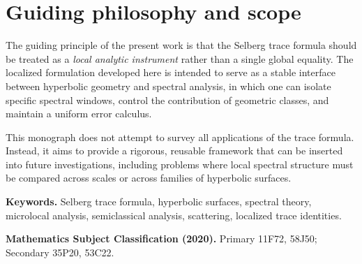 \section*{Guiding philosophy and scope}

The guiding principle of the present work is that the Selberg trace formula should be treated as a \emph{local analytic instrument} rather than a single global equality.
The localized formulation developed here is intended to serve as a stable interface between hyperbolic geometry and spectral analysis, in which one can isolate specific spectral windows, control the contribution of geometric classes, and maintain a uniform error calculus.

This monograph does not attempt to survey all applications of the trace formula.
Instead, it aims to provide a rigorous, reusable framework that can be inserted into future investigations, including problems where local spectral structure must be compared across scales or across families of hyperbolic surfaces.

\medskip

\noindent
\textbf{Keywords.}
Selberg trace formula, hyperbolic surfaces, spectral theory, microlocal analysis, semiclassical analysis, scattering, localized trace identities.

\medskip

\noindent
\textbf{Mathematics Subject Classification (2020).}
Primary 11F72, 58J50; Secondary 35P20, 53C22.

